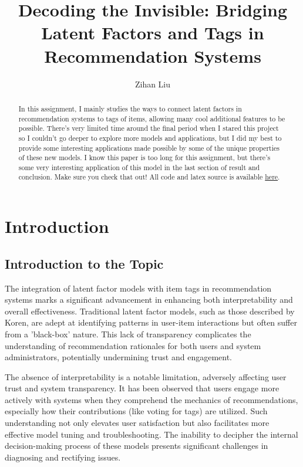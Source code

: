 \documentclass[sigplan,screen]{acmart}
\begin{document}
\title{Decoding the Invisible: Bridging Latent Factors and Tags in Recommendation Systems}

\author{Zihan Liu}


\begin{abstract}
In this assignment, I mainly studies the ways to connect latent factors in 
recommendation systems to tags of items, allowing many cool additional features 
to be possible. There's very limited time around the final period when I stared 
this project so I couldn't go deeper to explore more models and applications, 
but I did my best to provide some interesting applications made possible by
some of the unique properties of these new models.
I know this paper is too long for this assignment, but
there's some very interesting application of this model in
the last section of result and conclusion. Make sure you check that out!
All code and latex source is available \href{https://github.com/anananan116/CSE158-Assignment2}{here}.
\end{abstract}


\maketitle

\section{Introduction}
\subsection{Introduction to the Topic}
The integration of latent factor models with item tags in recommendation systems marks a significant advancement in enhancing both interpretability and overall effectiveness. Traditional latent factor models, such as those described by Koren\cite{Koren09}, are adept at identifying patterns in user-item interactions but often suffer from a 'black-box' nature. This lack of transparency complicates the understanding of recommendation rationales for both users and system administrators, potentially undermining trust and engagement.

The absence of interpretability is a notable limitation, adversely affecting user trust and system transparency. It has been observed that users engage more actively with systems when they comprehend the mechanics of recommendations, especially how their contributions (like voting for tags) are utilized.\cite{Cosley07, Rashid02} Such understanding not only elevates user satisfaction but also facilitates more effective model tuning and troubleshooting. The inability to decipher the internal decision-making process of these models presents significant challenges in diagnosing and rectifying issues.\cite{KonstanRiedl12}
\end{document}
